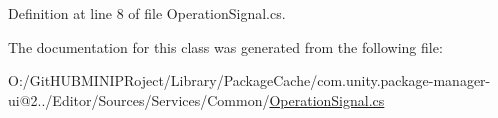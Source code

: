 Definition at line 8 of file Operation\+Signal.\+cs.



The documentation for this class was generated from the following file\+:\begin{DoxyCompactItemize}
\item 
O\+:/\+Git\+H\+U\+B\+M\+I\+N\+I\+P\+Roject/\+Library/\+Package\+Cache/com.\+unity.\+package-\/manager-\/ui@2../\+Editor/\+Sources/\+Services/\+Common/\mbox{\hyperlink{_operation_signal_8cs}{Operation\+Signal.\+cs}}\end{DoxyCompactItemize}
